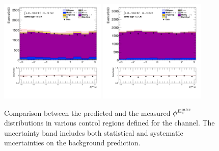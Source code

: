 \begin{figure}[!htp]
\begin{center}
			\includegraphics[width=0.45\textwidth]{chapters/chapter6_HPlus/images/taulep/met_phi_SS_TAUEL.png} 
			\includegraphics[width=0.45\textwidth]{chapters/chapter6_HPlus/images/taulep/met_phi_SS_TAUMU.png} \\
			\end{center}
			\caption{
			Comparison between the predicted and the measured $\phi^{E_\text{T}^\text{miss}}$ distributions in various control regions defined for the \taulep channel. The uncertainty band includes both statistical and systematic uncertainties on the background prediction. 
			}
			\label{fig:bkg-met-phi-taulep}
		\end{figure}


		\clearpage
